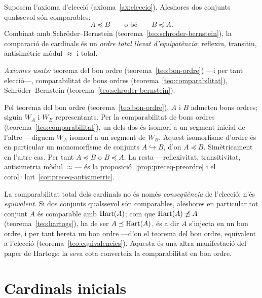 \begin{teorema}\label{teo:comparabilitat-cardinals}
Suposem l'axioma d'elecció (axioma~\ref{ax:eleccio}). Aleshores dos conjunts
qualssevol són comparables:
\[
A\preceq B
\qquad\text{o bé}\qquad
B\preceq A .
\]
Combinat amb Schröder--Bernstein (teorema~\ref{teo:schroder-bernstein}), la
comparació de cardinals és un \emph{ordre total llevat d'equipotència}:
reflexiu, transitiu, antisimètric mòdul \(\approx\) i total.\par
\emph{Axiomes usats:} teorema del bon ordre (teorema~\ref{teo:bon-ordre}) ---i
per tant elecció---, comparabilitat de bons ordres
(teorema~\ref{teo:comparabilitat}), Schröder--Bernstein
(teorema~\ref{teo:schroder-bernstein}).
\end{teorema}

\begin{prova}
Pel teorema del bon ordre (teorema~\ref{teo:bon-ordre}), \(A\) i \(B\) admeten
bons ordres; siguin \(W_A\) i \(W_B\) representants. Per la comparabilitat de
bons ordres (teorema~\ref{teo:comparabilitat}), un dels dos és isomorf a un
segment inicial de l'altre ---diguem \(W_A\) isomorf a un segment de \(W_B\).
Aquest isomorfisme d'ordre és en particular un monomorfisme de conjunts
\(A\hookrightarrow B\), d'on \(A\preceq B\). Simètricament en l'altre cas. Per
tant \(A\preceq B\) o \(B\preceq A\). La resta ---reflexivitat, transitivitat,
antisimetria mòdul \(\approx\)--- és la proposició~\ref{prop:preceq-preordre} i
el corol·lari~\ref{cor:preceq-antisimetric}.
\end{prova}

\begin{observacio}\label{obs:comparabilitat-eleccio}
La comparabilitat total dels cardinals no és només \emph{conseqüència} de
l'elecció: n'és \emph{equivalent}. Si dos conjunts qualssevol són comparables,
aleshores en particular tot conjunt \(A\) és comparable amb \(\operatorname{Hart}(A)\); com
que \(\operatorname{Hart}(A)\not\preceq A\) (teorema~\ref{teo:hartogs}), ha de ser
\(A\preceq\operatorname{Hart}(A)\), és a dir \(A\) s'injecta en un bon ordre, i per tant
hereta un bon ordre ---d'on el teorema del bon ordre, equivalent a l'elecció
(teorema~\ref{teo:equivalencies}). Aquesta és una altra manifestació del
paper de Hartogs: la seva cota converteix la comparabilitat en bon ordre.
\end{observacio}

\section{Cardinals inicials}\label{sec:cardinals-inicials}


